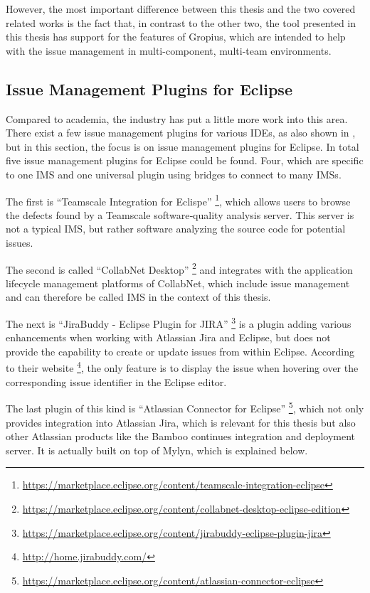 However, the most important difference between this thesis and the two covered related works
is the fact that, in contrast to the other two, the tool presented in this thesis has support for the features of \gls{Gropius},
which are intended to help with the issue management in multi-component, multi-team environments.


\subsection{Issue Management Plugins for Eclipse}
\label{ssec:ch2:ss2.3}
Compared to academia, the industry has put a little more work into this area.
There exist a few issue management plugins for various \glspl{IDE}, as also shown in \cite{janak2009issue}, 
but in this section, the focus is on issue management plugins for \gls{Eclipse}.
In total five issue management plugins for \gls{Eclipse} could be found.
Four, which are specific to one \gls{IMS} and one universal plugin using bridges to connect to many \glspl{IMS}.

The first is ``Teamscale Integration for Eclispe'' \footnote{\url{https://marketplace.eclipse.org/content/teamscale-integration-eclipse}}, 
which allows users to browse the defects found by a Teamscale software‐quality analysis server.
This server is not a typical \gls{IMS}, but rather software analyzing the source code for potential issues.

The second is called ``CollabNet Desktop'' \footnote{\url{https://marketplace.eclipse.org/content/collabnet-desktop-eclipse-edition}} and 
integrates with the application lifecycle management platforms of CollabNet, which include issue management and can therefore be called \gls{IMS} in the context of this thesis.

The next is ``JiraBuddy - Eclipse Plugin for JIRA'' \footnote{\url{https://marketplace.eclipse.org/content/jirabuddy-eclipse-plugin-jira}}
is a plugin adding various enhancements when working with Atlassian Jira and \gls{Eclipse}, but does not provide the capability to create or update 
issues from within \gls{Eclipse}. According to their website \footnote{\url{http://home.jirabuddy.com/}}, the only feature is to display the issue when hovering over the corresponding issue identifier in the \gls{Eclipse} editor.

The last plugin of this kind is ``Atlassian Connector for Eclipse'' \footnote{\url{https://marketplace.eclipse.org/content/atlassian-connector-eclipse}},
which not only provides integration into Atlassian Jira, which is relevant for this thesis but also other Atlassian products like the Bamboo continues integration and deployment server.
It is actually built on top of Mylyn, which is explained below.


